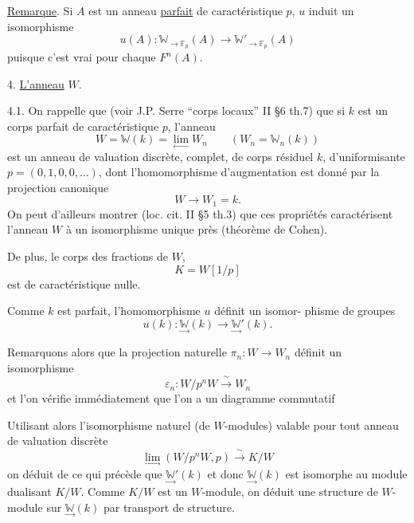 \documentclass[11pt]{article}
\newcommand{\scanpage}[1]{\par\bigskip\noindent{\small\sffamily[scan #1]}\par}
\newcommand{\mspage}[1]{{\small\sffamily[p.\,#1]}}
\newcommand{\hand}[1]{\textcolor{blue}{#1}}
\newcommand{\uline}[1]{\underline{#1}}
\newenvironment{diagramblock}{\par\begin{center}}{\end{center}\par}
\begin{document}
\uline{Remarque}. Si $A$ est un anneau \uline{parfait} de caractéristique $p$, $u$ induit
un isomorphisme
\[ u(A) : \mathbb{W}_{\to\mathbb{F}_p}(A) \to \mathbb{W}'_{\to\mathbb{F}_p}(A) \]
puisque c'est vrai pour chaque $F^n(A)$.

4. \uline{L'anneau} $W$.

4.1. On rappelle que (voir J.P. Serre ``corps locaux'' II §6 th.7)
que si $k$ est un corps parfait de caractéristique $p$, l'anneau
\[ W = \mathbb{W}(k) = \lim_{\leftarrow} W_n \qquad (W_n = \mathbb{W}_n(k)) \]
est un anneau de valuation discrète, complet, de corps résiduel $k$,
d'uniformisante $p = (0,1,0,0,\ldots)$, dont l'homomorphisme d'augmentation
est donné par la projection canonique
\[ W \to W_1 = k . \]
On peut d'ailleurs montrer (loc. cit. II §5 th.3) que ces propriétés
caractérisent l'anneau $W$ à un isomorphisme unique près (théorème de
Cohen).

De plus, le corps des fractions de $W$,
\[ K = W[1/p] \]
est de caractéristique nulle.

\mspage{\hand{7}}

\clearpage
\scanpage{129/8}
Comme $k$ est parfait, l'homomorphisme $u$ définit un isomor-%
phisme de groupes
\[ u(k) : \underset{\to}{\mathbb{W}}(k) \to \underset{\to}{\mathbb{W}}'(k) . \]

Remarquons alors que la projection naturelle $\pi_n : W \to W_n$
définit un isomorphisme
\[ \varepsilon_n : W/p^nW \xrightarrow{\ \sim\ } W_n \]
et l'on vérifie immédiatement que l'on a un diagramme commutatif
\begin{diagramblock}
\end{diagramblock}

Utilisant alors l'isomorphisme naturel (de $W$-modules) valable pour tout
anneau de valuation discrète
\[ \underset{\to}{\lim}(W/p^nW,p) \xrightarrow{\ \sim\ } K/W \]
on déduit de ce qui précède que $\underset{\to}{\mathbb{W}}'(k)$ et donc $\underset{\to}{\mathbb{W}}(k)$ est isomorphe
au module dualisant $K/W$. Comme $K/W$ est un $W$-module, on déduit une
structure de $W$-module sur $\underset{\to}{\mathbb{W}}(k)$ par transport de structure.
\end{document}
